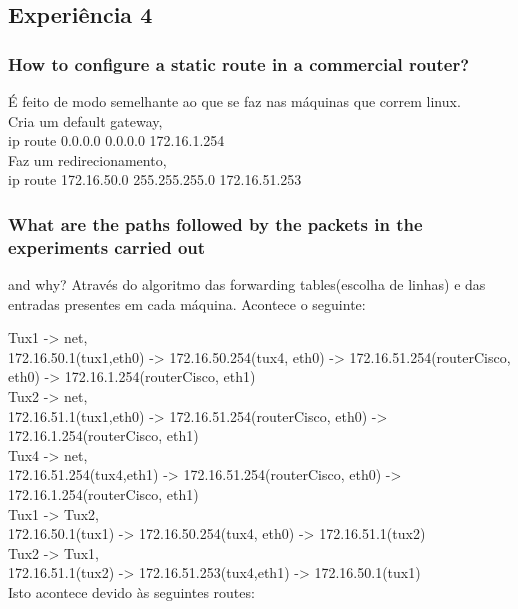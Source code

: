 \documentclass[a4paper]{article}
\begin{document}
\subsection{Experiência 4}

\subsubsection{How to configure a static route in a commercial router?}
É feito de modo semelhante ao que se faz nas máquinas que correm linux.\\

\noindent Cria um default gateway,\\
ip route 0.0.0.0 0.0.0.0 172.16.1.254\\

\noindent Faz um redirecionamento,\\
ip route 172.16.50.0 255.255.255.0 172.16.51.253

\subsubsection{What are the paths followed by the packets in the experiments carried out}
and why?
Através do algoritmo das forwarding tables(escolha de linhas) e das entradas presentes em cada máquina. Acontece o seguinte:

\noindent Tux1 -> net,\\
172.16.50.1(tux1,eth0) -> 172.16.50.254(tux4, eth0) -> 172.16.51.254(routerCisco, eth0) -> 172.16.1.254(routerCisco, eth1)\\

\noindent Tux2 -> net,\\
172.16.51.1(tux1,eth0) -> 172.16.51.254(routerCisco, eth0) -> 172.16.1.254(routerCisco, eth1)\\

\noindent Tux4 -> net,\\
172.16.51.254(tux4,eth1) -> 172.16.51.254(routerCisco, eth0) -> 172.16.1.254(routerCisco, eth1)\\

\noindent Tux1 -> Tux2,\\
172.16.50.1(tux1) -> 172.16.50.254(tux4, eth0) -> 172.16.51.1(tux2)\\

\noindent Tux2 -> Tux1,\\
172.16.51.1(tux2) -> 172.16.51.253(tux4,eth1) -> 172.16.50.1(tux1)\\

\noindent Isto acontece devido às seguintes routes:\\
\end{document}
